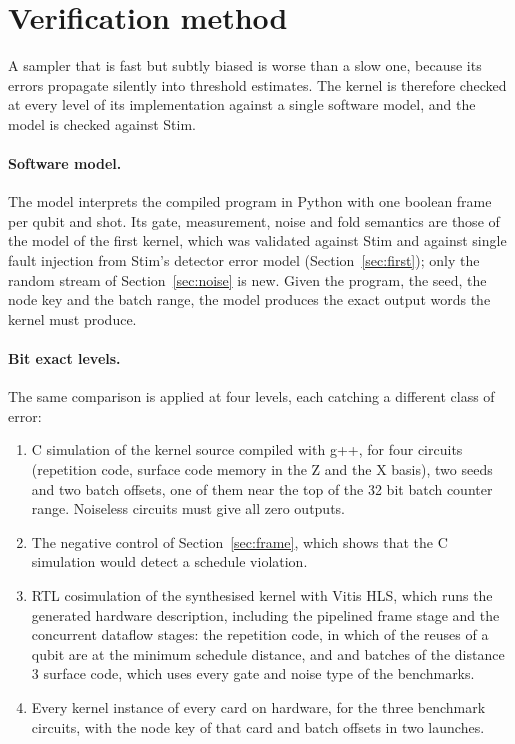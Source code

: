 \section{Verification method}\label{sec:verification}

A sampler that is fast but subtly biased is worse than a slow one, because its errors propagate silently into
threshold estimates. The kernel is therefore checked at every level of its implementation against a single software
model, and the model is checked against Stim.

\paragraph{Software model.} The model interprets the compiled program in Python with one boolean frame per qubit and
shot. Its gate, measurement, noise and fold semantics are those of the model of the first kernel, which was validated
against Stim and against single fault injection from Stim's detector error model (Section~\ref{sec:first}); only the
random stream of Section~\ref{sec:noise} is new. Given the program, the seed, the node key and the batch range, the model
produces the exact output words the kernel must produce.

\paragraph{Bit exact levels.} The same comparison is applied at four levels, each catching a different class of
error:
\begin{enumerate}
\item C simulation of the kernel source compiled with g++, for four circuits (repetition code, surface code memory in
the Z and the X basis), two seeds and two batch offsets, one of them near the top of the 32 bit batch counter range. Noiseless circuits must give all zero outputs.
\item The negative control of Section~\ref{sec:frame}, which shows that the C simulation would detect a schedule
violation.
\item RTL cosimulation of the synthesised kernel with Vitis HLS, which runs the generated hardware description,
including the pipelined frame stage and the concurrent dataflow stages: the repetition code, in which \NumRepReusesAtD{} of the
\NumRepReuses{} reuses of a qubit are at the minimum schedule distance, and \NumCosimBatchesA{} and \NumCosimBatchesB{} batches of the
distance 3 surface code, which uses every gate and noise type of the benchmarks.
\item Every kernel instance of every card on hardware, for the three benchmark circuits, with the node key of that
card and batch offsets in two launches.
\end{enumerate}

